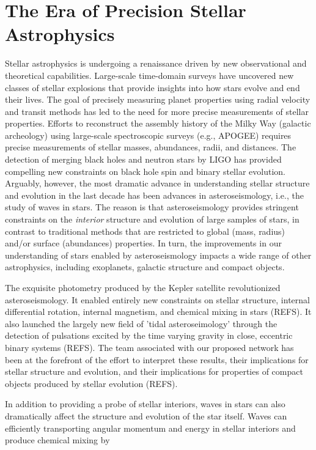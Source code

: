 \section{The Era of Precision Stellar Astrophysics}

Stellar astrophysics is undergoing a renaissance driven by new observational and theoretical capabilities. Large-scale time-domain surveys have uncovered new classes of stellar explosions that provide insights into how stars evolve and end their lives.  The goal of precisely measuring planet properties using radial velocity and transit methods has led to the need for more precise measurements of stellar properties.  Efforts to reconstruct the assembly history of the Milky Way (galactic archeology) using large-scale spectroscopic surveys (e.g., APOGEE) requires precise measurements of stellar masses, abundances, radii, and distances.   The detection of merging black holes and neutron stars by LIGO has provided compelling new constraints on black hole spin and binary stellar evolution. Arguably, however, the most dramatic advance in understanding stellar structure and evolution in the last decade has been advances in asteroseismology, i.e., the study of waves in stars.   The reason is that asteroseismology provides stringent constraints on the {\em interior} structure and evolution of large samples of stars, in contrast to traditional methods that are restricted to global (mass, radius) and/or surface (abundances) properties.   In turn, the improvements in our understanding of stars enabled by asteroseismology impacts a wide range of other astrophysics, including exoplanets, galactic structure and compact objects.  

The exquisite photometry produced by the Kepler satellite revolutionized asteroseismology.  It enabled entirely new constraints on stellar structure, internal differential rotation, internal magnetism, and chemical mixing in stars (REFS).  It also launched the largely new field of 'tidal asteroseimology' through the detection of pulsations excited by the time varying gravity in close, eccentric binary systems (REFS). The team associated with our proposed network has been at the forefront of the effort to interpret these results, their implications for stellar structure and evolution, and their implications for properties of compact objects produced by stellar evolution (REFS).   

In addition to providing a probe of stellar interiors, waves in stars can also dramatically affect the structure and evolution of the star itself.   Waves can efficiently transporting angular momentum and energy in stellar interiors and produce chemical mixing by
